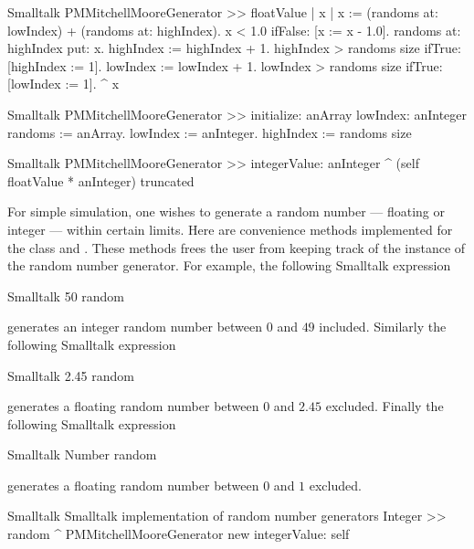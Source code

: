\begin{displaycode}{Smalltalk}
PMMitchellMooreGenerator >> floatValue
    | x |
    x := (randoms at: lowIndex) + (randoms at: highIndex).
    x < 1.0 ifFalse: [x := x - 1.0].
    randoms at: highIndex put: x.
    highIndex := highIndex + 1.
    highIndex > randoms size ifTrue: [highIndex := 1].
    lowIndex := lowIndex + 1.
    lowIndex > randoms size ifTrue: [lowIndex := 1].
    ^ x
\end{displaycode}

\begin{displaycode}{Smalltalk}
PMMitchellMooreGenerator >> initialize: anArray lowIndex: anInteger
    randoms := anArray.
    lowIndex := anInteger.
    highIndex := randoms size
\end{displaycode}

\begin{displaycode}{Smalltalk}
PMMitchellMooreGenerator >> integerValue: anInteger
    ^ (self floatValue * anInteger) truncated
\end{displaycode}

For simple simulation, one wishes to generate a random number ---
floating or integer --- within certain limits.
Here are convenience methods implemented for the class  and .
These methods frees the user from keeping track of the instance of the random number generator.
For example, the following Smalltalk expression

\begin{displaycode}{Smalltalk}
50 random
\end{displaycode}

\noindent generates an integer random number between $0$ and $49$ included. Similarly the following Smalltalk expression

\begin{displaycode}{Smalltalk}
 2.45 random
\end{displaycode}

\noindent generates a floating random number between $0$ and $2.45$ excluded. Finally the following Smalltalk expression

\begin{displaycode}{Smalltalk}
Number random
\end{displaycode}

\noindent generates a floating random number between $0$ and $1$ excluded.

\label{lst:randomuse}
\begin{listing}[label=lst:matrix]{Smalltalk}
  {Smalltalk implementation of random number generators}
Integer >> random
    ^ PMMitchellMooreGenerator new integerValue: self
\end{listing}

